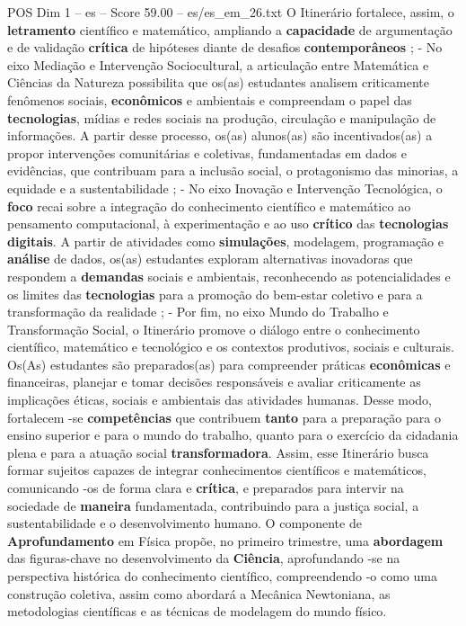 \begin{textsample}{POS Dim 1 – es – Score 59.00 – es/es\_em\_26.txt}
O Itinerário fortalece, assim, o \textbf{letramento} científico e matemático, ampliando a \textbf{capacidade} de argumentação e de validação \textbf{crítica} de hipóteses diante de desafios \textbf{contemporâneos} ; - No eixo Mediação e Intervenção Sociocultural, a articulação entre Matemática e Ciências da Natureza possibilita que os(as) estudantes analisem criticamente fenômenos sociais, \textbf{econômicos} e ambientais e compreendam o papel das \textbf{tecnologias}, mídias e redes sociais na produção, circulação e manipulação de informações.
A partir desse processo, os(as) alunos(as) são incentivados(as) a propor intervenções comunitárias e coletivas, fundamentadas em dados e evidências, que contribuam para a inclusão social, o protagonismo das minorias, a equidade e a sustentabilidade ; - No eixo Inovação e Intervenção Tecnológica, o \textbf{foco} recai sobre a integração do conhecimento científico e matemático ao pensamento computacional, à experimentação e ao uso \textbf{crítico} das \textbf{tecnologias} \textbf{digitais}.
A partir de atividades como \textbf{simulações}, modelagem, programação e \textbf{análise} de dados, os(as) estudantes exploram alternativas inovadoras que respondem a \textbf{demandas} sociais e ambientais, reconhecendo as potencialidades e os limites das \textbf{tecnologias} para a promoção do bem-estar coletivo e para a transformação da realidade ; - Por fim, no eixo Mundo do Trabalho e Transformação Social, o Itinerário promove o diálogo entre o conhecimento científico, matemático e tecnológico e os contextos produtivos, sociais e culturais.
Os(As) estudantes são preparados(as) para compreender práticas \textbf{econômicas} e financeiras, planejar e tomar decisões responsáveis e avaliar criticamente as implicações éticas, sociais e ambientais das atividades humanas.
Desse modo, fortalecem -se \textbf{competências} que contribuem \textbf{tanto} para a preparação para o ensino superior e para o mundo do trabalho, quanto para o exercício da cidadania plena e para a atuação social \textbf{transformadora}.
Assim, esse Itinerário busca formar sujeitos capazes de integrar conhecimentos científicos e matemáticos, comunicando -os de forma clara e \textbf{crítica}, e preparados para intervir na sociedade de \textbf{maneira} fundamentada, contribuindo para a justiça social, a sustentabilidade e o desenvolvimento humano.
O componente de \textbf{Aprofundamento} em Física propõe, no primeiro trimestre, uma \textbf{abordagem} das figuras-chave no desenvolvimento da \textbf{Ciência}, aprofundando -se na perspectiva histórica do conhecimento científico, compreendendo -o como uma construção coletiva, assim como abordará a Mecânica Newtoniana, as metodologias científicas e as técnicas de modelagem do mundo físico.

\end{textsample}
